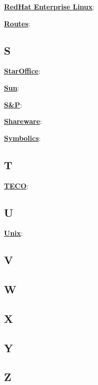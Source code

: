 \underline{\textbf{RedHat Enterprise Linux}}: %

\underline{\textbf{Routes}}: %



\subsection{S}

\underline{\textbf{StarOffice}}: %

\underline{\textbf{Sun}}: 

\underline{\textbf{S\&P}}: %

\underline{\textbf{Shareware}}: %

\underline{\textbf{Symbolics}}: %

\subsection{T}

\underline{\textbf{TECO}}: %

\subsection{U}

\underline{\textbf{Unix}}: %

\subsection{V}

\subsection{W}

\subsection{X}

\subsection{Y}

\subsection{Z}


	




